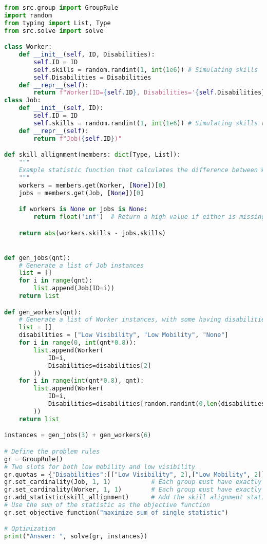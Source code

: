 \begin{lstlisting}[language=Python, caption={Creating and solving a Fair Matching Problem using this framework.}, label={script:fair_bipartite_matching}]
from src.group import GroupRule
import random
from typing import List, Type
from src.solve import solve

class Worker:
    def __init__(self, ID, Disabilities):
        self.ID = ID
        self.skills = random.randint(1, int(1e6)) # Simulating skills
        self.Disabilities = Disabilities
    def __repr__(self):
        return f"Worker(ID={self.ID}, Disabilities='{self.Disabilities}')"
class Job:
    def __init__(self, ID):
        self.ID = ID
        self.skills = random.randint(1, int(1e6)) # Simulating skills required
    def __repr__(self):
        return f"Job({self.ID})"

def skill_allignment(members: dict[Type, List]):
    """
    Example statistic function that calculates the difference between Workers' and Jobs' skills.
    """
    workers = members.get(Worker, [None])[0]
    jobs = members.get(Job, [None])[0]

    if workers is None or jobs is None:
        return float('inf')  # Return a high value if either is missing

    return abs(workers.skills - jobs.skills)


def gen_jobs(qnt):
    # Generate a list of Job instances
    list = []
    for i in range(qnt):
        list.append(Job(ID=i))
    return list

def gen_workers(qnt):
    # Generate a list of Worker instances, with some having disabilities
    list = []
    disabilities = ["Low Visibility", "Low Mobility", "None"]
    for i in range(0, int(qnt*0.8)):
        list.append(Worker(
            ID=i,
            Disabilities=disabilities[2]
        ))
    for i in range(int(qnt*0.8), qnt):
        list.append(Worker(
            ID=i,
            Disabilities=disabilities[random.randint(0,len(disabilities)-1)]
        ))
    return list

instances = gen_jobs(3) + gen_workers(6)

# Define the problem rules
gr = GroupRule()
# Two slots for both low mobility and low visibility
gr.quotas = {"Disabilities":[["Low Visibility", 2],["Low Mobility", 2]]}
gr.set_cardinality(Job, 1, 1)           # Each group must have exactly 1 job
gr.set_cardinality(Worker, 1, 1)        # Each group must have exactly 1 worker
gr.add_statistic(skill_allignment)      # Add the skill alignment statistic
# Use the sum of the statistic as the objective function
gr.set_objective_function("maximize_sum_of_single_statistic")  

# Optimization
print("Answer: ", solve(gr, instances))
\end{lstlisting}